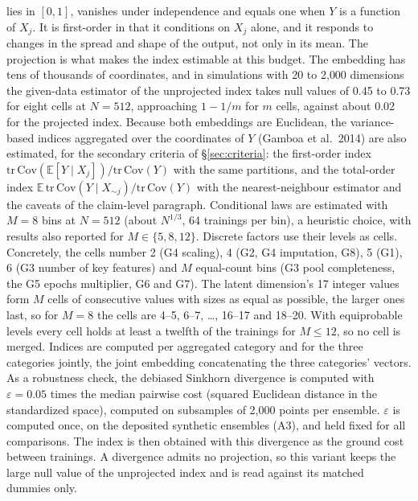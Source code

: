 \documentclass[11pt,a4paper]{article}
\begin{document}
lies in $[0,1]$, vanishes under independence and equals one when $Y$ is a
function of $X_j$. It is first-order in that it conditions on $X_j$ alone,
and it responds to changes in the spread and shape of the output, not only
in its mean. The projection is what makes the index estimable at this
budget. The embedding has tens of thousands of coordinates, and in
simulations with 20 to 2{,}000 dimensions the given-data estimator of the
unprojected index takes null values of 0.45 to 0.73 for eight cells at
$N=512$, approaching $1-1/m$ for $m$ cells, against about 0.02 for the
projected index. Because
both embeddings are Euclidean, the variance-based indices aggregated over
the coordinates of $Y$ (Gamboa et al.\ 2014) are also estimated, for the
secondary criteria of \S\ref{sec:criteria}: the first-order index
$\mathrm{tr}\,\mathrm{Cov}(\mathbb{E}[Y\mid X_j])/\mathrm{tr}\,\mathrm{Cov}(Y)$
with the same partitions, and the total-order index
$\mathbb{E}\,\mathrm{tr}\,\mathrm{Cov}(Y\mid X_{\sim j})/\mathrm{tr}\,\mathrm{Cov}(Y)$
with the nearest-neighbour estimator and the caveats of the claim-level
paragraph.
Conditional laws are estimated with $M=8$ bins at $N=512$ (about
$N^{1/3}$, 64 trainings per bin), a heuristic choice, with results also
reported for $M\in\{5,8,12\}$. Discrete factors use their levels as cells.
Concretely, the cells number 2 (G4 scaling), 4 (G2, G4 imputation,
G8), 5 (G1), 6 (G3 number of key features) and $M$ equal-count bins (G3
pool completeness, the G5 epochs multiplier, G6 and G7). The latent
dimension's 17 integer values form $M$ cells of consecutive values with
sizes as equal as possible, the larger ones last, so for $M=8$ the cells
are 4--5, 6--7, \dots, 16--17 and 18--20. With equiprobable levels every
cell holds at least a twelfth of the trainings for $M\le 12$, so no cell
is merged. Indices are computed per aggregated category and for the
three categories jointly, the joint embedding concatenating the three
categories' vectors. As a robustness check, the debiased
Sinkhorn divergence is computed with $\varepsilon = 0.05$ times the median
pairwise cost (squared Euclidean distance in the standardized space),
computed on subsamples of 2{,}000 points per ensemble. $\varepsilon$ is
computed once, on the deposited synthetic ensembles (A3), and held fixed
for all comparisons. The index is then obtained with this divergence as
the ground cost between trainings. A divergence admits no projection, so
this variant keeps the large null value of the unprojected index and is
read against its matched dummies only.
\end{document}

